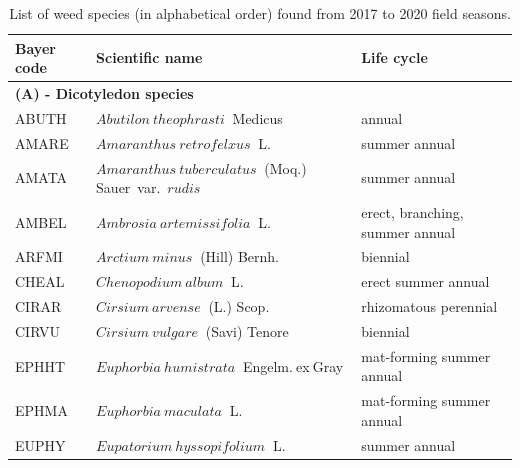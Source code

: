 \documentclass[
]{article}
\begin{document}
\begin{table}

\caption{\label{tab:list-sp}List of weed species (in alphabetical order) found from 2017 to 2020 field seasons.}
\centering
\begin{tabular}[t]{l|l|l}
\hline
Bayer code & Scientific name & Life cycle\\
\hline
\multicolumn{3}{l}{\textbf{(A) - Dicotyledon species}}\\
\hline
\hspace{1em}ABUTH & $Abutilon~theophrasti$$~$ Medicus & annual\\
 
\hspace{1em}AMARE & $Amaranthus~retrofelxus$$~$ L. & summer annual\\
 
\hspace{1em}AMATA & $Amaranthus~tuberculatus$$~$ (Moq.) Sauer~var.~$rudis$ & summer annual\\
 
\hspace{1em}AMBEL & $Ambrosia~artemissifolia$$~$ L. & erect, branching, summer annual\\
 
\hspace{1em}ARFMI & $Arctium~minus$$~$ (Hill) Bernh. & biennial\\
 
\hspace{1em}CHEAL & $Chenopodium~album$$~$ L. & erect summer annual\\
 
\hspace{1em}CIRAR & $Cirsium~arvense$$~$ (L.) Scop. & rhizomatous perennial\\
 
\hspace{1em}CIRVU & $Cirsium~vulgare$$~$ (Savi) Tenore & biennial\\
 
\hspace{1em}EPHHT & $Euphorbia~humistrata$$~$ Engelm.$~$ex$~$Gray & mat-forming summer annual\\
 
\hspace{1em}EPHMA & $Euphorbia~maculata$$~$ L. & mat-forming summer annual\\
 
\hspace{1em}EUPHY & $Eupatorium~hyssopifolium$$~$ L. & summer annual\\
 

\end{tabular}
\end{table}
\end{document}
